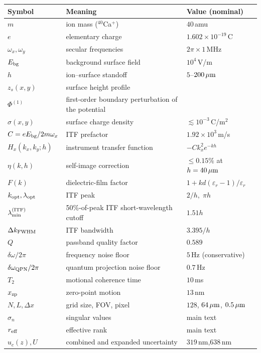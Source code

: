 \documentclass[12pt,a4paper]{article}
\begin{document}
\begin{center}
\small
\begin{tabular}{@{}lll@{}}
\hline
Symbol & Meaning & Value (nominal) \\
\hline
$m$ & ion mass (${}^{40}$Ca$^+$) & $40$\,amu \\
$e$ & elementary charge & $1.602\times10^{-19}$\,C \\
$\omega_x,\omega_y$ & secular frequencies & $2\pi\times1$\,MHz \\
$E_{\rm bg}$ & background surface field & $10^4$\,V/m \\
$h$ & ion--surface standoff & $5$--$200\,\mu\textup{m}$ \\
$z_s(x,y)$ & surface height profile & \\
$\Phi^{(1)}$ & first-order boundary perturbation of the potential & \\
$\sigma(x,y)$ & surface charge density & $\lesssim10^{-3}$\,C/m$^2$ \\
$C = eE_{\rm bg}/2m\omega_x$ & ITF prefactor & $1.92\times10^3$\,m/s \\
$H_x(k_x,k_y;h)$ & instrument transfer function & $-Ck_x^2e^{-kh}$ \\
$\eta(k,h)$ & self-image correction & $\le0.15\%$ at $h=40\,\mu\textup{m}$ \\
$F(k)$ & dielectric-film factor & $1+kd(\varepsilon_r-1)/\varepsilon_r$ \\
$k_{\rm opt},\lambda_{\rm opt}$ & ITF peak & $2/h,\;\pi h$ \\
$\lambda_{\min}^{\rm(ITF)}$ & 50\%-of-peak ITF short-wavelength cutoff & $1.51h$ \\
$\Delta k_{\rm FWHM}$ & ITF bandwidth & $3.395/h$ \\
$Q$ & passband quality factor & $0.589$ \\
$\delta\omega/2\pi$ & frequency noise floor & $5$\,Hz (conservative) \\
$\delta\omega_{\rm QPN}/2\pi$ & quantum projection noise floor & $0.7$\,Hz \\
$T_2$ & motional coherence time & $10$\,ms \\
$x_{\rm zp}$ & zero-point motion & $13$\,nm \\
$N,L,\Delta x$ & grid size, FOV, pixel & $128$, $64\,\mu\textup{m}$, $0.5\,\mu\textup{m}$ \\
$\sigma_n$ & singular values & main text \\
$r_{\rm eff}$ & effective rank & main text \\
$u_c(z), U$ & combined and expanded uncertainty & $319$\,nm,\;$638$\,nm \\
\hline
\end{tabular}
\end{center}
\end{document}
